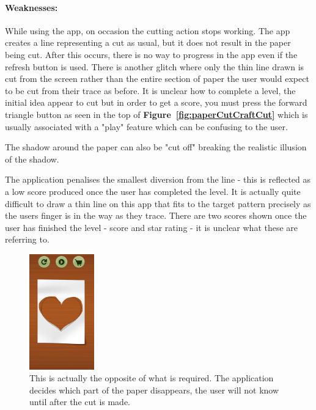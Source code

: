 \documentclass[11pt]{article}
\begin{document}
                \paragraph{Weaknesses:}
                While using the app, on occasion the cutting action stops working. The app creates a line representing a cut as usual, but it does not result in the paper being cut. After this occurs, there is no way to progress in the app even if the refresh button is used. There is another glitch where only the thin line drawn is cut from the screen rather than the entire section of paper the user would expect to be cut from their trace as before. 
                It is unclear how to complete a level, the initial idea appear to cut but in order to get a score, you must press the forward triangle button as seen in the top of \textbf{Figure~\ref{fig:paperCutCraftCut}} which is usually associated with a "play" feature which can be confusing to the user. 
                
                The shadow around the paper can also be "cut off" breaking the realistic illusion of the shadow.
                
                The application penalises the smallest diversion from the line - this is reflected as a low score produced once the user has completed the level. It is actually quite difficult to draw a thin line on this app that fits to the target pattern precisely as the users finger is in the way as they trace. There are two scores shown once the user has finished the level - score and star rating - it is unclear what these are referring to. 
                
                 \begin{figure}
                \includegraphics[width=0.25\textwidth]{Images/paperCutCraftReveal.png}
                    \caption{This is actually the opposite of what is required. The application decides which part of the paper disappears, the user will not know until after the cut is made.}
                    \label{fig:paperCutCraftReveal}
                \end{figure}
                
\end{document}
